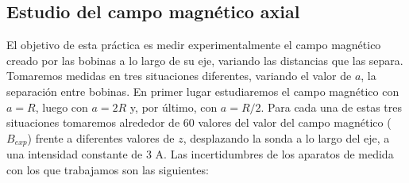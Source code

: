 \documentclass[a4paper,12pt,titlepage]{article}
\begin{document}
\subsection{Estudio del campo magnético axial}

El objetivo de esta práctica es medir experimentalmente el campo magnético creado por las bobinas a lo largo de su eje, variando las distancias que las separa. Tomaremos medidas en tres situaciones diferentes, variando el valor de $a$, la separación entre bobinas. En primer lugar estudiaremos el campo magnético con $a=R$, luego con $a=2R$ y, por último, con $a=R/2$. Para cada una de estas tres situaciones tomaremos alrededor de 60 valores del valor del campo magnético ($B_{exp}$) frente a diferentes valores de $z$, desplazando la sonda a lo largo del eje, a una intensidad constante de 3 A. Las incertidumbres de los aparatos de medida con los que trabajamos son las siguientes:
\end{document}
